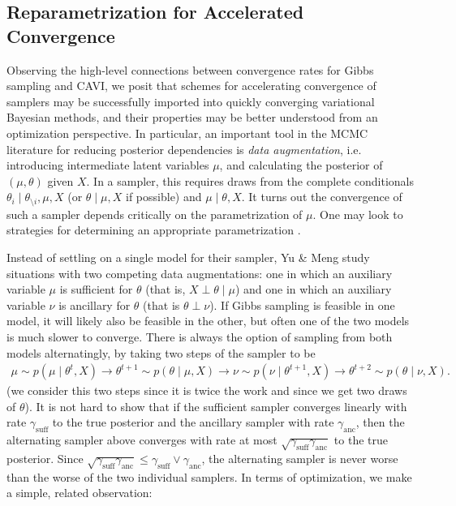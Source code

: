 \documentclass{article}
\begin{document}
\newpage

\subsection{Reparametrization for Accelerated Convergence} 

Observing the high-level connections between convergence rates for Gibbs sampling and CAVI, we posit that schemes for accelerating convergence of samplers may be successfully imported into quickly converging variational Bayesian methods, and their properties may be better understood from an optimization perspective. In particular, an important tool in the MCMC literature for reducing posterior dependencies is {\sl data augmentation}, i.e. introducing intermediate latent variables $\mu$, and calculating the posterior of $(\mu,\theta)$ given $X$. In a sampler, this requires draws from the complete conditionals $\theta_i \mid \theta_{\setminus i},\mu,X$ (or $\theta\mid \mu,X$ if possible) and $\mu \mid \theta,X$. It turns out the convergence of such a sampler depends critically on the parametrization of $\mu$. One may look to strategies for determining an appropriate parametrization \cite{Papaspiliopoulos}. 


Instead of settling on a single model for their sampler, Yu \& Meng \cite{Yu} study situations with two competing data augmentations: one in which an auxiliary variable $\mu$ is sufficient for $\theta$ (that is, $X\perp\theta\mid \mu$) and one in which an auxiliary variable $\nu$ is ancillary for $\theta$ (that is $\theta\perp \nu$). If Gibbs sampling is feasible in one model, it will likely also be feasible in the other, but often one of the two models is much slower to converge. There is always the option of sampling from both models alternatingly, by taking two steps of the sampler to be
\begin{align}
\mu\sim p(\mu \mid \theta^t,X) \to \theta^{t+1}\sim p(\theta \mid \mu,X) \to \nu\sim p(\nu\mid \theta^{t+1},X) \to \theta^{t+2}\sim p(\theta\mid \nu, X).
\end{align}
(we consider this two steps since it is twice the work and since we get two draws of $\theta$). It is not hard to show that if the sufficient sampler converges linearly with rate $\gamma_{\text{suff}}$ to the true posterior and the ancillary sampler with rate $\gamma_{\text{anc}}$, then the alternating sampler above converges with rate at most $\sqrt{\gamma_{\text{suff}}\gamma_{\text{anc}}}$ to the true posterior. Since $\sqrt{\gamma_{\text{suff}}\gamma_{\text{anc}}} \le \gamma_{\text{suff}}\lor\gamma_{\text{anc}}$, the alternating sampler is never worse than the worse of the two individual samplers. In terms of optimization, we make a simple, related observation: 
\end{document}
